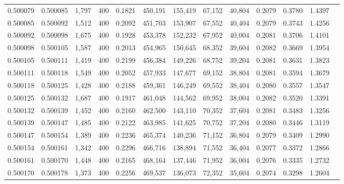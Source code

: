 \begin{tabular}{rrrrrrrrrrrrr}
0.500079 & 0.500085 & 1,797 & 400 &                                     0.1821 & 450,191 & 155,419 &  67,152 &  40,804 & 0.2079 & 0.3780 & 1.4397 \\
0.500085 & 0.500092 & 1,512 & 400 &                                     0.2092 & 451,703 & 153,907 &  67,552 &  40,404 & 0.2079 & 0.3743 & 1.4256 \\
0.500092 & 0.500098 & 1,675 & 400 &                                     0.1928 & 453,378 & 152,232 &  67,952 &  40,004 & 0.2081 & 0.3706 & 1.4101 \\
0.500098 & 0.500105 & 1,587 & 400 &                                     0.2013 & 454,965 & 150,645 &  68,352 &  39,604 & 0.2082 & 0.3669 & 1.3954 \\
0.500105 & 0.500111 & 1,419 & 400 &                                     0.2199 & 456,384 & 149,226 &  68,752 &  39,204 & 0.2081 & 0.3631 & 1.3823 \\
0.500111 & 0.500118 & 1,549 & 400 &                                     0.2052 & 457,933 & 147,677 &  69,152 &  38,804 & 0.2081 & 0.3594 & 1.3679 \\
0.500118 & 0.500125 & 1,428 & 400 &                                     0.2188 & 459,361 & 146,249 &  69,552 &  38,404 & 0.2080 & 0.3557 & 1.3547 \\
0.500125 & 0.500132 & 1,687 & 400 &                                     0.1917 & 461,048 & 144,562 &  69,952 &  38,004 & 0.2082 & 0.3520 & 1.3391 \\
0.500132 & 0.500139 & 1,452 & 400 &                                     0.2160 & 462,500 & 143,110 &  70,352 &  37,604 & 0.2081 & 0.3483 & 1.3256 \\
0.500139 & 0.500147 & 1,485 & 400 &                                     0.2122 & 463,985 & 141,625 &  70,752 &  37,204 & 0.2080 & 0.3446 & 1.3119 \\
0.500147 & 0.500154 & 1,389 & 400 &                                     0.2236 & 465,374 & 140,236 &  71,152 &  36,804 & 0.2079 & 0.3409 & 1.2990 \\
0.500154 & 0.500161 & 1,342 & 400 &                                     0.2296 & 466,716 & 138,894 &  71,552 &  36,404 & 0.2077 & 0.3372 & 1.2866 \\
0.500161 & 0.500170 & 1,448 & 400 &                                     0.2165 & 468,164 & 137,446 &  71,952 &  36,004 & 0.2076 & 0.3335 & 1.2732 \\
0.500170 & 0.500178 & 1,373 & 400 &                                     0.2256 & 469,537 & 136,073 &  72,352 &  35,604 & 0.2074 & 0.3298 & 1.2604 \\

\end{tabular}
